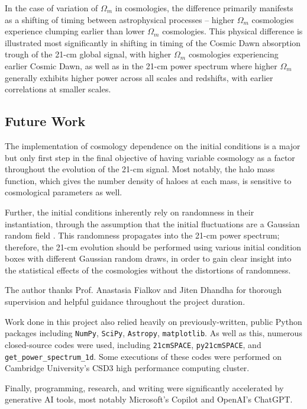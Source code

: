 \documentclass[floats,floatfix,showpacs,amssymb,prd,superscriptaddress,nofootinbib]{revtex4-2} %
\newcommand{\code}{\texttt}
\begin{document}
In the case of variation of $\Omega_m$ in cosmologies, the difference primarily manifests as a shifting of timing between astrophysical processes -- higher $\Omega_m$ cosmologies experience clumping earlier than lower $\Omega_m$ cosmologies. This physical difference is illustrated most significantly in shifting in timing of the Cosmic Dawn absorption trough of the 21-cm global signal, with higher $\Omega_m$ cosmologies experiencing earlier Cosmic Dawn, as well as in the 21-cm power spectrum where higher $\Omega_m$ generally exhibits higher power across all scales and redshifts, with earlier correlations at smaller scales.
\subsection{Future Work}
The implementation of cosmology dependence on the initial conditions is a major but only first step in the final objective of having variable cosmology as a factor throughout the evolution of the 21-cm signal. Most notably, the halo mass function, which gives the number density of haloes at each mass, is sensitive to cosmological parameters as well. 

Further, the initial conditions inherently rely on randomness in their instantiation, through the assumption that the initial fluctuations are a Gaussian random field \citep{Guth_Pi_1982, Brandenberger_1985}. This randomness propagates into the 21-cm power spectrum; therefore, the 21-cm evolution should be performed using various initial condition boxes with different Gaussian random draws, in order to gain clear insight into the statistical effects of the cosmologies without the distortions of randomness.



\begin{acknowledgments}
The author thanks Prof. Anastasia Fialkov and Jiten Dhandha for thorough supervision and helpful guidance throughout the project duration. 

Work done in this project also relied heavily on previously-written, public Python packages including \code{NumPy}, \code{SciPy}, \code{Astropy}, \code{matplotlib}. As well as this, numerous closed-source codes were used, including \code{21cmSPACE}, \code{py21cmSPACE}, and \code{get\_power\_spectrum\_1d}. Some executions of these codes were performed on Cambridge University's CSD3 high performance computing cluster.

Finally, programming, research, and writing were significantly accelerated by generative AI tools, most notably Microsoft's Copilot and OpenAI's ChatGPT. 
\end{acknowledgments}
\end{document}
